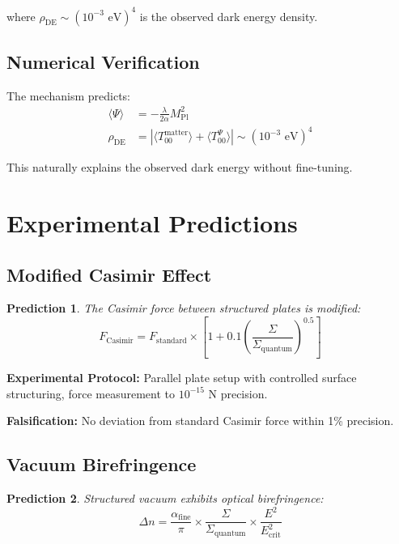 \documentclass[12pt,a4paper]{article}
\newcommand{\structuring}{\Sigma}
\newcommand{\planck}{M_{\text{Pl}}}
\newcommand{\sequester}{\Psi}
\newtheorem{prediction}{Prediction}
\begin{document}
where $\rho_{\text{DE}} \sim (10^{-3} \text{ eV})^4$ is the observed dark energy density.

\subsection{Numerical Verification}

The mechanism predicts:
\begin{align}
\langle \sequester \rangle &= -\frac{\lambda}{2\alpha} \planck^2 \\
\rho_{\text{DE}} &= \left|\langle T_{00}^{\text{matter}} \rangle + \langle T_{00}^{\sequester} \rangle\right| \sim (10^{-3} \text{ eV})^4
\end{align}

This naturally explains the observed dark energy without fine-tuning.

\section{Experimental Predictions}

\subsection{Modified Casimir Effect}

\begin{prediction}
The Casimir force between structured plates is modified:
\begin{equation}
F_{\text{Casimir}} = F_{\text{standard}} \times \left[1 + 0.1 \left(\frac{\structuring}{\structuring_{\text{quantum}}}\right)^{0.5}\right]
\end{equation}
\end{prediction}

\textbf{Experimental Protocol:} Parallel plate setup with controlled surface structuring, force measurement to $10^{-15}$ N precision.

\textbf{Falsification:} No deviation from standard Casimir force within 1\% precision.

\subsection{Vacuum Birefringence}

\begin{prediction}
Structured vacuum exhibits optical birefringence:
\begin{equation}
\Delta n = \frac{\alpha_{\text{fine}}}{\pi} \times \frac{\structuring}{\structuring_{\text{quantum}}} \times \frac{E^2}{E_{\text{crit}}^2}
\end{equation}
\end{prediction}
\end{document}
